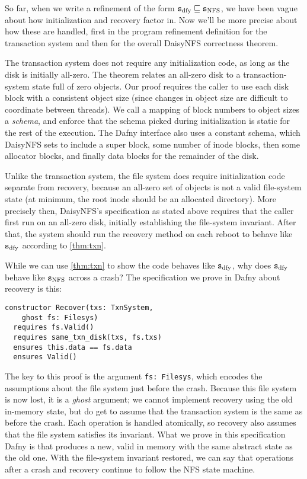 So far, when we write a refinement of the form $\texttt{s}_{\mathrm{dfy}} \sqsubseteq \texttt{s}_{\mathrm{NFS}}$, we have
been vague about how initialization and recovery factor in. Now we'll
be more precise about how these are handled, first in the program refinement
definition for the transaction system and then for the overall DaisyNFS
correctness theorem.

The transaction system does not require any initialization code, as long as the
disk is initially all-zero. The theorem relates an all-zero disk to a
transaction-system state full of zero objects. Our proof requires the caller to
use each disk block with a consistent object size (since changes in object size
are difficult to coordinate between threads). We call a mapping of block numbers
to object sizes a \emph{schema}, and enforce that the schema picked during
initialization is static for the rest of the execution. The Dafny interface also
uses a constant schema, which DaisyNFS sets to include a super block, some
number of inode blocks, then some allocator blocks, and finally data blocks
for the remainder of the disk.

Unlike the transaction system, the file system does require initialization code
separate from recovery, because an all-zero set of objects is not a valid
file-system state (at minimum, the root inode should be an allocated directory).
More precisely then, DaisyNFS's specification as stated above requires that the
caller first run  on an all-zero disk, initially establishing the
file-system invariant. After that, the system should run the recovery method on
each reboot to behave like $\texttt{s}_{\mathrm{dfy}}$ according to \autoref{thm:txn}.

While we can use \autoref{thm:txn} to show the code behaves like $\texttt{s}_{\mathrm{dfy}}$, why
does $\texttt{s}_{\mathrm{dfy}}$ behave like $\texttt{s}_{\mathrm{NFS}}$ across a crash? The specification we prove in
Dafny about recovery is this:

\begin{verbatim}
constructor Recover(txs: TxnSystem,
    ghost fs: Filesys)
  requires fs.Valid()
  requires same_txn_disk(txs, fs.txs)
  ensures this.data == fs.data
  ensures Valid()
\end{verbatim}

The key to this proof is the argument \texttt{fs: Filesys}, which encodes the
assumptions about the file system just before the crash. Because this file
system is now lost, it is a \emph{ghost} argument; we cannot implement recovery
using the
old in-memory state, but do get to assume that the transaction system 
is the same as before the crash. Each operation is handled
atomically, so recovery also assumes that the file system satisfies its
 invariant. What we prove in this specification Dafny
is that  produces a new, valid  in memory with the
same abstract state as the old one. With the file-system invariant restored, we
can say that operations after a crash and recovery continue to follow the NFS
state machine.

